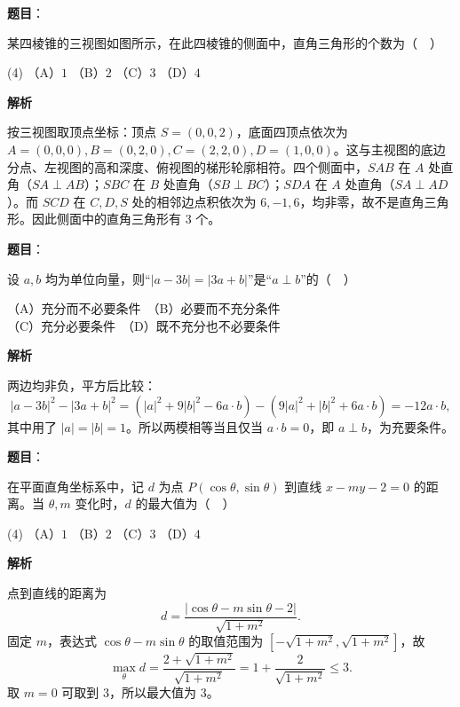 \begin{answer}

\textbf{题目}：

某四棱锥的三视图如图所示，在此四棱锥的侧面中，直角三角形的个数为（　）
\nopagebreak[4]
\begin{center}\end{center}
\nopagebreak[4]
\begin{gkopts}(4)
\task （A）$1$
\task （B）$2$
\task （C）$3$
\task （D）$4$
\end{gkopts}

\textbf{解析}

按三视图取顶点坐标：顶点 $S=(0,0,2)$，底面四顶点依次为 $A=(0,0,0),B=(0,2,0),C=(2,2,0),D=(1,0,0)$。这与主视图的底边分点、左视图的高和深度、俯视图的梯形轮廓相符。四个侧面中，$SAB$ 在 $A$ 处直角（$SA\perp AB$）；$SBC$ 在 $B$ 处直角（$SB\perp BC$）；$SDA$ 在 $A$ 处直角（$SA\perp AD$）。而 $SCD$ 在 $C,D,S$ 处的相邻边点积依次为 $6,-1,6$，均非零，故不是直角三角形。因此侧面中的直角三角形有 $3$ 个。


\end{answer}
\begin{answer}

\textbf{题目}：

设 $a,b$ 均为单位向量，则“$|a-3b|=|3a+b|$”是“$a\perp b$”的（　）

（A）充分而不必要条件　（B）必要而不充分条件\\
（C）充分必要条件　（D）既不充分也不必要条件

\textbf{解析}

两边均非负，平方后比较：
\nopagebreak[4]
\[
|a-3b|^2-|3a+b|^2
=(|a|^2+9|b|^2-6a\cdot b)-(9|a|^2+|b|^2+6a\cdot b)
=-12a\cdot b,
\]
其中用了 $|a|=|b|=1$。所以两模相等当且仅当 $a\cdot b=0$，即 $a\perp b$，为充要条件。


\end{answer}
\begin{answer}

\textbf{题目}：

在平面直角坐标系中，记 $d$ 为点 $P(\cos\theta,\sin\theta)$ 到直线 $x-my-2=0$ 的距离。当 $\theta,m$ 变化时，$d$ 的最大值为（　）

\begin{gkopts}(4)
\task （A）$1$
\task （B）$2$
\task （C）$3$
\task （D）$4$
\end{gkopts}

\textbf{解析}

点到直线的距离为
\nopagebreak[4]
\[
d=\frac{|\cos\theta-m\sin\theta-2|}{\sqrt{1+m^2}}.
\]
固定 $m$，表达式 $\cos\theta-m\sin\theta$ 的取值范围为 $[-\sqrt{1+m^2},\sqrt{1+m^2}]$，故
\nopagebreak[4]
\[
\max_\theta d=\frac{2+\sqrt{1+m^2}}{\sqrt{1+m^2}}
=1+\frac2{\sqrt{1+m^2}}\leqslant3.
\]
取 $m=0$ 可取到 $3$，所以最大值为 $3$。


\end{answer}
